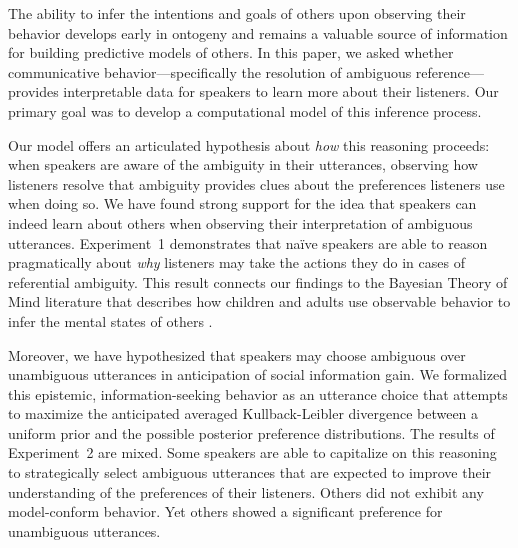 \documentclass[11pt,a4paper]{article}
\newcommand{\gcs}[1]{\textcolor{blue}{[gcs: #1]}}
\begin{document}
The ability to infer the intentions and goals of others upon observing their behavior develops early in ontogeny \cite{Liu:2017} and remains a valuable source of information for building predictive models of others. 
In this paper, we asked whether communicative behavior---specifically the resolution of ambiguous reference---provides interpretable data for speakers to learn more about their listeners. Our primary goal was to develop a computational model of this inference process.

Our model offers an articulated hypothesis about \emph{how} this reasoning proceeds: when speakers are aware of the ambiguity in their utterances, observing how listeners resolve that ambiguity provides clues about the preferences listeners use when doing so.
We have found strong support for the idea that speakers can indeed learn about others when observing their interpretation of ambiguous utterances.
Experiment~1 demonstrates that na\"ive speakers are able to reason pragmatically about \emph{why} listeners may take the actions they do in cases of referential ambiguity.
This result connects our findings to the Bayesian Theory of Mind literature that describes how children and adults use observable behavior to infer the mental states of others \cite{Baker:2009,baker2017rational}.

Moreover, we have hypothesized that speakers may choose ambiguous over unambiguous utterances in anticipation of social information gain. 
We formalized this epistemic, information-seeking behavior as an utterance choice that attempts to maximize the anticipated averaged Kullback-Leibler divergence between a uniform prior and the possible posterior preference distributions.
The results of Experiment~2 are mixed. 
Some speakers are able to capitalize on this reasoning to strategically select ambiguous utterances that are expected to improve their understanding of the preferences of their listeners.
Others did not exhibit any model-conform behavior. 
Yet others showed a significant preference for unambiguous utterances. 
\end{document}
